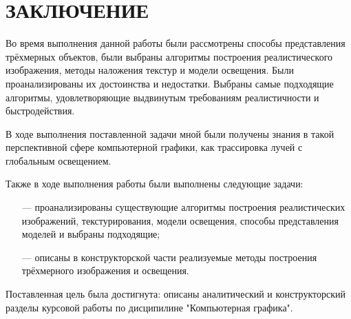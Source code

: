 \section*{ЗАКЛЮЧЕНИЕ}

Во время выполнения данной работы были рассмотрены способы представления трёхмерных объектов, были выбраны алгоритмы построения реалистического изображения, методы наложения текстур и модели освещения. Были проанализированы их достоинства и недостатки. Выбраны самые подходящие алгоритмы, удовлетворяющие выдвинутым требованиям реалистичности и быстродействия.

В ходе выполнения поставленной задачи мной были получены знания в такой перспективной сфере компьютерной графики, как трассировка лучей с глобальным освещением.

Также в ходе выполнения работы были выполнены следующие задачи:
\begin{itemize}
	\item[---] проанализированы существующие алгоритмы построения реалистических изображений, текстурирования, модели освещения, способы представления моделей и выбраны подходящие;
	\item[---] описаны в конструкторской части реализуемые методы построения трёхмерного изображения и освещения.
\end{itemize}

Поставленная цель была достигнута: описаны аналитический и конструкторский разделы курсовой работы по дисципилине "Компьютерная графика".

\pagebreak